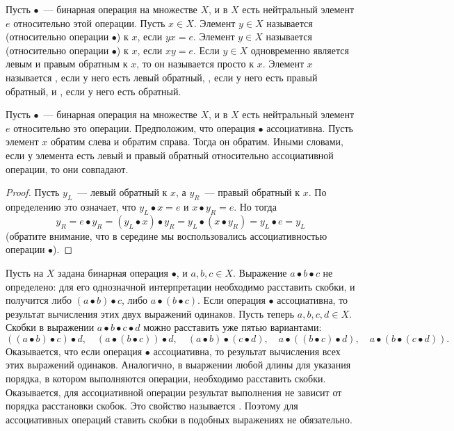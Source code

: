 \begin{definition}
Пусть $\bullet$~--- бинарная операция на множестве $X$, и в $X$ есть
нейтральный элемент $e$ относительно этой операции.
Пусть $x\in X$. Элемент $y\in X$ называется
(относительно операции $\bullet$) к $x$, если $yx = e$.
Элемент $y\in X$ называется
 (относительно
операции $\bullet$) к $x$, если $xy = e$.
Если $y\in X$ одновременно является левым и правым обратным к
$x$, то он называется просто  к
$x$. Элемент $x$ называется
,
если у него есть левый
обратный, ,
если у него есть правый обратный, и
, если у него есть обратный.
\end{definition}

\begin{lemma}
Пусть $\bullet$~--- бинарная операция на множестве $X$, и в $X$ есть
нейтральный элемент $e$ относительно это операции. Предположим, что
операция $\bullet$ ассоциативна. Пусть элемент $x$ обратим слева и
обратим справа. Тогда он обратим. Иными словами, если у элемента есть
левый и правый обратный относительно ассоциативной операции, то они
совпадают.
\end{lemma}
\begin{proof}
Пусть $y_L$~--- левый обратный к $x$, а $y_R$~--- правый обратный к
$x$. По определению это означает, что $y_L\bullet x = e$
и $x\bullet y_R = e$. Но тогда
$$
y_R = e\bullet y_R = (y_L\bullet x)\bullet y_R = y_L\bullet (x\bullet y_R) =
y_L\bullet e = y_L
$$
(обратите внимание, что в середине мы воспользовались ассоциативностью
операции $\bullet$).
\end{proof}

Пусть на $X$ задана бинарная операция $\bullet$, и $a,b,c\in
X$. Выражение $a\bullet b\bullet c$ не определено: для его однозначной
интерпретации необходимо расставить скобки, и получится либо
$(a\bullet b)\bullet c$, либо $a\bullet (b\bullet c)$. Если операция
$\bullet$ ассоциативна, то результат вычисления этих двух выражений
одинаков. Пусть теперь $a,b,c,d\in X$. Скобки в выражении $a\bullet
b\bullet c\bullet d$ можно расставить уже пятью вариантами:
$$
((a\bullet b)\bullet c)\bullet d,\quad
(a\bullet (b\bullet c))\bullet d,\quad
(a\bullet b)\bullet (c\bullet d),\quad
a\bullet((b\bullet c)\bullet d),\quad
a\bullet (b\bullet (c\bullet d)).
$$
Оказывается, что если операция $\bullet$ ассоциативна, то результат
вычисления всех этих выражений одинаков.
Аналогично, в выаржении любой длины для указания порядка, в котором
выполняются операции, необходимо расставить скобки. Оказывается, для
ассоциативной операции результат выполнения
не зависит от порядка расстановки скобок. Это
свойство называется . Поэтому для
ассоциативных операций ставить скобки в подобных выражениях не
обязательно.

